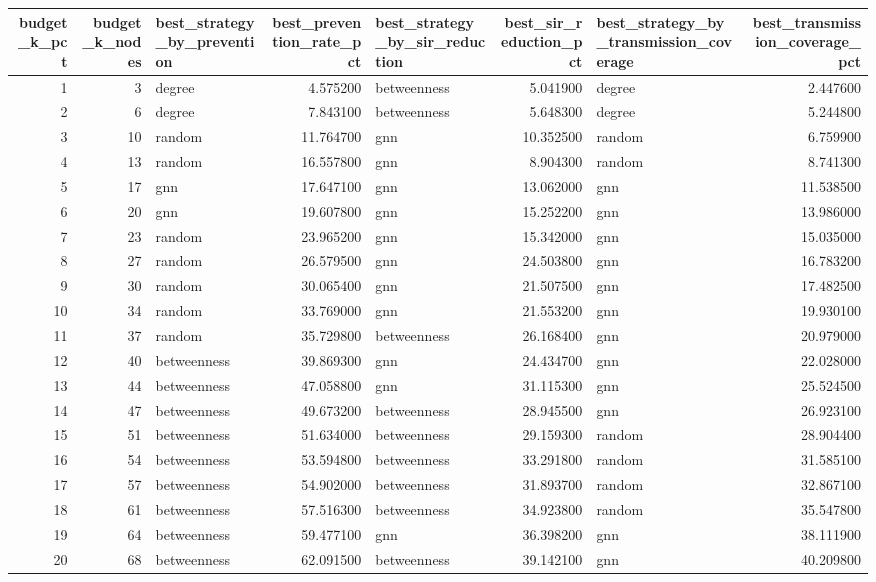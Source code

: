 \begin{tabular}{rrlrlrlr}
\toprule
budget\_k\_pct & budget\_k\_nodes & best\_strategy\_by\_prevention & best\_prevention\_rate\_pct & best\_strategy\_by\_sir\_reduction & best\_sir\_reduction\_pct & best\_strategy\_by\_transmission\_coverage & best\_transmission\_coverage\_pct \\
\midrule
1 & 3 & degree & 4.575200 & betweenness & 5.041900 & degree & 2.447600 \\
2 & 6 & degree & 7.843100 & betweenness & 5.648300 & degree & 5.244800 \\
3 & 10 & random & 11.764700 & gnn & 10.352500 & random & 6.759900 \\
4 & 13 & random & 16.557800 & gnn & 8.904300 & random & 8.741300 \\
5 & 17 & gnn & 17.647100 & gnn & 13.062000 & gnn & 11.538500 \\
6 & 20 & gnn & 19.607800 & gnn & 15.252200 & gnn & 13.986000 \\
7 & 23 & random & 23.965200 & gnn & 15.342000 & gnn & 15.035000 \\
8 & 27 & random & 26.579500 & gnn & 24.503800 & gnn & 16.783200 \\
9 & 30 & random & 30.065400 & gnn & 21.507500 & gnn & 17.482500 \\
10 & 34 & random & 33.769000 & gnn & 21.553200 & gnn & 19.930100 \\
11 & 37 & random & 35.729800 & betweenness & 26.168400 & gnn & 20.979000 \\
12 & 40 & betweenness & 39.869300 & gnn & 24.434700 & gnn & 22.028000 \\
13 & 44 & betweenness & 47.058800 & gnn & 31.115300 & gnn & 25.524500 \\
14 & 47 & betweenness & 49.673200 & betweenness & 28.945500 & gnn & 26.923100 \\
15 & 51 & betweenness & 51.634000 & betweenness & 29.159300 & random & 28.904400 \\
16 & 54 & betweenness & 53.594800 & betweenness & 33.291800 & random & 31.585100 \\
17 & 57 & betweenness & 54.902000 & betweenness & 31.893700 & random & 32.867100 \\
18 & 61 & betweenness & 57.516300 & betweenness & 34.923800 & random & 35.547800 \\
19 & 64 & betweenness & 59.477100 & gnn & 36.398200 & gnn & 38.111900 \\
20 & 68 & betweenness & 62.091500 & betweenness & 39.142100 & gnn & 40.209800 \\
\bottomrule
\end{tabular}
